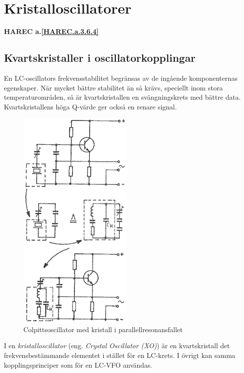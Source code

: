 \section{Kristalloscillatorer}
\textbf{HAREC a.\ref{HAREC.a.3.6.4}\label{myHAREC.a.3.6.4}}

\subsection{Kvartskristaller i oscillatorkopplingar}

En LC-oscillators frekvensstabilitet begränsas av de ingående
komponenternas egenskaper.
När mycket bättre stabilitet än så krävs, speciellt inom stora
temperaturområden, så är kvartskristallen en svängningskrets med bättre data.
Kvartskristallens höga Q-värde ger också en renare signal.

\begin{figure}
  \includegraphics[width=0.5\textwidth]{images/cropped_pdfs/bild_2_3-75.pdf}
  \caption{Colpittsoscillator med kristall i parallellresonansfallet}
  \label{fig:BildII3-75}
\end{figure}

I en \emph{kristalloscillator} (eng. \emph{Crystal Oscillator (XO)}) är en
kvartskristall det frekvensbestämmande elementet i stället för en LC-krets.
I övrigt kan samma kopplingsprinciper som för en LC-VFO användas.

